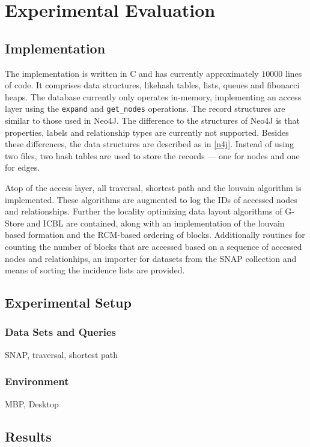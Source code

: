 \chapter{Experimental Evaluation}\label{\positionnumber} 
\section{Implementation}\label{\positionnumber}
    The implementation is written in C and has currently approximately $10 000$ lines of code.
    It comprises data structures, likehash tables, lists, queues and fibonacci heaps. 
    The database currently only operates in-memory, implementing an access layer using the \texttt{expand} and \texttt{get_nodes} operations.
    The record structures are similar to those used in Neo4J. 
    The difference to the structures of Neo4J is that properties, labels and relationship types are currently not supported.
    Besides these differences, the data structures are described as in \ref{n4j}.
    Instead of using two files, two hash tables are used to store the records --- one for nodes and one for edges.
    
    Atop of the access layer, all traversal, shortest path and the louvain algorithm is implemented. These algorithms are augmented to log the IDs of accessed nodes and relationships.
    Further the locality optimizing data layout algorithms of G-Store and ICBL are contained, along with an implementation of the louvain based formation and the RCM-based ordering of blocks.
    Additionally routines for counting the number of blocks that are accessed based on a sequence of accessed nodes and relationhips, an importer for datasets from the SNAP collection and means of sorting the incidence lists are provided.
    
\section{Experimental Setup}\label{\positionnumber}
    \subsection{Data Sets and Queries}\label{\positionnumber}
    SNAP, traversal, shortest path
    \subsection{Environment}\label{\positionnumber}
    MBP, Desktop
    
\section{Results}\label{\positionnumber}
